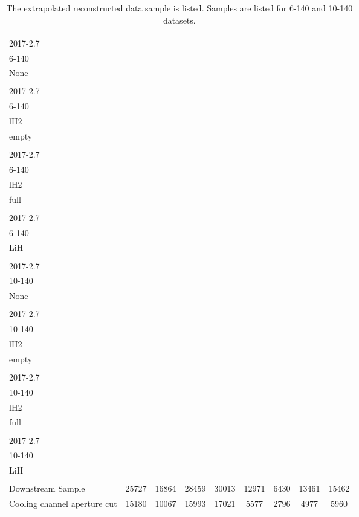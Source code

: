 \begin{landscape}
\begin{table}
\centering
\caption{The extrapolated reconstructed data sample is listed.  Samples are listed for 6-140 and 10-140 datasets.\label{tab:data_cuts_summary_2_1}}
\begin{tabular}[pos]{l|cccccccc}
                                                   & \splitcell{\\2017-2.7\\6-140\\None\\} & \splitcell{\\2017-2.7\\6-140\\lH2\\empty\\} & \splitcell{\\2017-2.7\\6-140\\lH2\\full\\} & \splitcell{\\2017-2.7\\6-140\\LiH\\} & \splitcell{\\2017-2.7\\10-140\\None\\} & \splitcell{\\2017-2.7\\10-140\\lH2\\empty\\} & \splitcell{\\2017-2.7\\10-140\\lH2\\full\\} & \splitcell{\\2017-2.7\\10-140\\LiH\\} \\
\hline                                            
Downstream Sample                                  &   25727  &   16864  &   28459  &   30013  &   12971  &    6430  &   13461  &   15462  \\
\hline                                            
Cooling channel aperture cut                       &   15180  &   10067  &   15993  &   17021  &    5577  &    2796  &    4977  &    5960  \\

\end{tabular}
\end{table}
\end{landscape}
